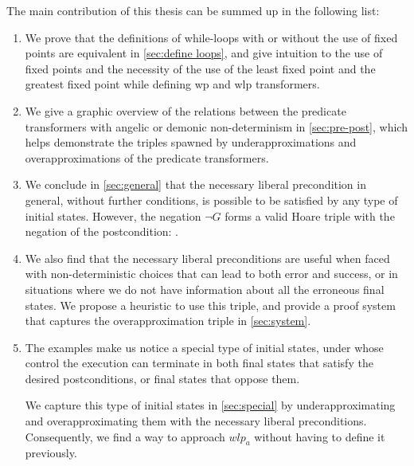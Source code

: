 The main contribution of this thesis can be summed up in the following list: 
\begin{enumerate}
    \item We prove that the definitions of while-loops with or without the use of fixed points are equivalent in \autoref{sec:define loops}, and give intuition to the use of fixed points and the necessity of the use of the least fixed point and the greatest fixed point while defining wp and wlp transformers. 
    \item We give a graphic overview of the relations between the predicate transformers with angelic or demonic non-determinism in \autoref{sec:pre-post}, which helps demonstrate the triples spawned by underapproximations and overapproximations of the predicate transformers. 
    \item We conclude in \autoref{sec:general} that the necessary liberal precondition in general, without further conditions, is possible to be satisfied by any type of initial states. However, the negation $\neg G$ forms a valid Hoare triple with the negation of the postcondition: . 
    \item We also find that the necessary liberal preconditions are useful when faced with non-deterministic choices that can lead to both error and success, or in situations where we do not have information about all the erroneous final states. We propose a heuristic to use this triple, and provide a proof system that captures the overapproximation triple in \autoref{sec:system}. 
    \item The examples make us notice a special type of initial states, under whose control the execution can terminate in both final states that satisfy the desired postconditions, or final states that oppose them. 
    
    We capture this type of initial states in \autoref{sec:special} by underapproximating and overapproximating them with the necessary liberal preconditions. Consequently, we find a way to approach $wlp_a$ without having to define it previously. 
\end{enumerate}


